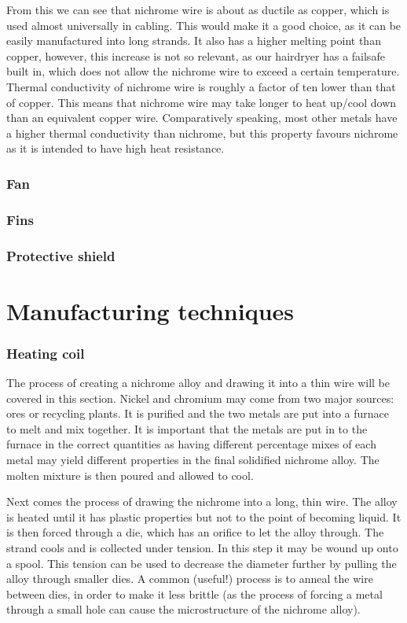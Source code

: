 \documentclass[12pt,a4paper, twoside]{report}
\begin{document}
From this we can see that nichrome wire is about as ductile as copper, which is used almost universally in cabling. This would make it a good choice, as it can be easily manufactured into long strands. It also has a higher melting point than copper, however, this increase is not so relevant, as our hairdryer has a failsafe built in, which does not allow the nichrome wire to exceed a certain temperature. Thermal conductivity of nichrome wire is roughly a factor of ten lower than that of copper. This means that nichrome wire may take longer to heat up/cool down than an equivalent copper wire. Comparatively speaking, most other metals have a higher thermal conductivity than nichrome, but this property favours nichrome as it is intended to have high heat resistance.
\subsubsection{Fan}
\subsubsection{Fins}
\subsubsection{Protective shield}
\section{Manufacturing techniques}
\subsubsection{Heating coil}
The process of creating a nichrome alloy and drawing it into a thin wire will be covered in this section. Nickel and chromium may come from two major sources: ores or recycling plants. It is purified and the two metals are put into a furnace to melt and mix together. It is important that the metals are put in to the furnace in the correct quantities as having different percentage mixes of each metal may yield different properties in the final solidified nichrome alloy. The molten mixture is then poured and allowed to cool. 

Next comes the process of drawing the nichrome into a long, thin wire. The alloy is heated until it has plastic properties but not to the point of becoming liquid. It is then forced through a die, which has an orifice to let the alloy through. The strand cools and is collected under tension. In this step it may be wound up onto a spool. This tension can be used to decrease the diameter further by pulling the alloy through smaller dies. A common (useful!) process is to anneal the wire between dies, in order to make it less brittle (as the process of forcing a metal through a small hole can cause the microstructure of the nichrome alloy). 
\end{document}
